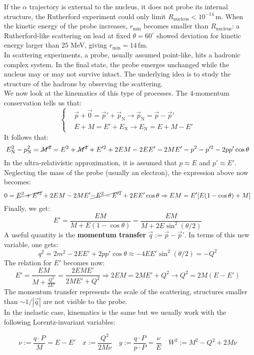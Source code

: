 \documentclass[10.75pt,a4paper,openright,bottom=2cm]{article}
\begin{document}
If the $\alpha$ trajectory is external to the nucleus, it does not probe its internal structure, the Rutherford experiment could only limit $R_{\text{nucleus}}<10^{-14}$\,m. When the kinetic energy of the probe increases, $r_{\min}$ becomes smaller than $R_{\text{nucleus}}$: a Rutherford-like scattering on lead at fixed $\theta=60^\circ$ showed deviation for kinetic energy larger than 25 MeV, giving $r_{\min}=14$\,fm.\\
In scattering experiments, a probe, usually assumed point-like, hits a hadronic complex system. In the final state, the probe emerges unchanged while the nucleus may or may not survive intact. The underlying idea is to study the structure of the hadrons by observing the scattering.\\
We now look at the kinematics of this type of processes. The 4-momentum conservation tells us that:
\[
\left\{
\begin{aligned}
&\Vec{p}+\Vec{0}=\Vec{p}'+\Vec{p}_{\text{N}}\to\Vec{p}_{\text{N}}=\Vec{p}-\Vec{p}'\\
&E+M=E'+E_{\text{N}}\to E_{\text{N}}=E+M-E'
\end{aligned}
\right.
\]
It follows that:
\[
E_{\text{N}}^2-p_{\text{N}}^2=\cancel{M^2}=E^2+\cancel{M^2}+E'^2+2EM-2EE'-2ME'-p^2-p'^2-2pp'\cos\theta
\]
In the ultra-relativistic approximation, it is assumed that $p\approx E$ and $p'\approx E'$. Neglecting the mass of the probe (usually an electron), the expression above now becomes:
\[
0=\cancel{E^2+E'^2}+2EM-2ME'\cancel{-E^2-E'^2}+2EE'\cos\theta\Rightarrow EM=E'[E(1-\cos\theta)+M]
\]
Finally, we get:
\[
E'=\frac{EM}{M+E(1-\cos\theta)}=\frac{EM}{M+2E\sin^2(\theta/2)}
\]
A useful quantity is the \textbf{momentum transfer} $\Vec{q}:=\Vec{p}-\Vec{p}'$. In terms of this new variable, one gets:
\[
q^2=2m^2-2EE'+2pp'\cos\theta\approx-4EE'\sin^2(\theta/2)=-Q^2
\]
The relation for $E'$ becomes now:
\[
E'=\frac{EM}{M+\frac{Q^2}{2E'}}=\frac{2EME'}{2ME'+Q^2}\Rightarrow 2EM=2ME'+Q^2\to Q^2=2M(E-E')
\]
The momentum transfer represents the scale of the scattering, structures smaller than $\sim1/|\Vec{q}|$ are not visible to the probe.\\
In the inelastic case, kinematics is the same but we usually work with the following Lorentz-invariant variables:
\begin{tcolorbox}[width=\textwidth,colback={yellow!50},title={Lorentz-Invariant Variables},colbacktitle={gray!50},coltitle=black]
\[
\nu:=\frac{q\cdot P}{M}=E-E' \quad x:=\frac{Q^2}{2M\nu} \quad y:=\frac{q\cdot P}{p\cdot P}=\frac{\nu}{E} \quad W^2:=M^2-Q^2+2M\nu
\]
\end{tcolorbox}
\end{document}
